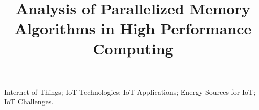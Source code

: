 \documentclass[journal, a4paper]{IEEEtran}
\begin{document}
	
	\title{Analysis of Parallelized Memory Algorithms in High Performance Computing}
	
	
	
	
	\maketitle
	
		
		
	
	\begin{IEEEkeywords}
		Internet of Things; IoT Technologies; IoT Applications; Energy Sources for IoT; IoT Challenges.
	\end{IEEEkeywords}
	
	
	
	
	
	
	
	\IEEEpeerreviewmaketitle
	
\end{document}
